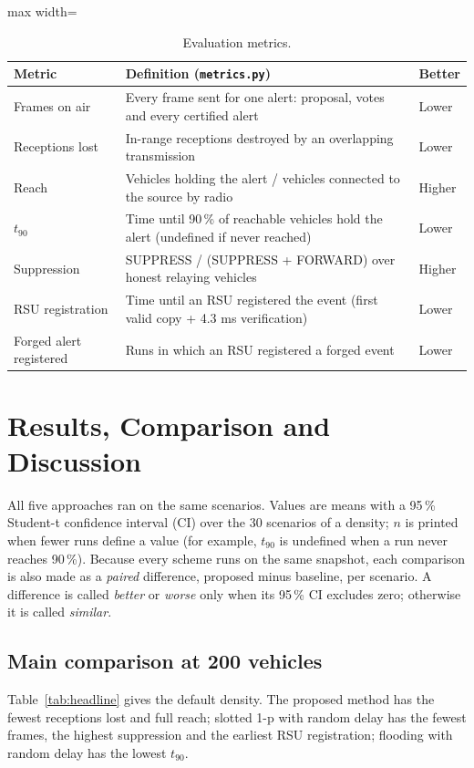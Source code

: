 \documentclass[11pt, a4paper]{article}
\begin{document}
\begin{table}[htbp]
\centering
\footnotesize
\renewcommand{\arraystretch}{1.2}
\begin{adjustbox}{max width=\textwidth}
\begin{tabular}{|p{4.4cm}|p{9.2cm}|p{1.6cm}|}
\hline
\textbf{Metric} & \textbf{Definition (\texttt{metrics.py})} & \textbf{Better} \\
\hline
Frames on air & Every frame sent for one alert: proposal, votes and every certified alert & Lower \\
Receptions lost & In-range receptions destroyed by an overlapping transmission & Lower \\
Reach & Vehicles holding the alert / vehicles connected to the source by radio & Higher \\
$t_{90}$ & Time until 90\,\% of reachable vehicles hold the alert (undefined if never reached) & Lower \\
Suppression & SUPPRESS / (SUPPRESS + FORWARD) over honest relaying vehicles & Higher \\
RSU registration & Time until an RSU registered the event (first valid copy + 4.3 ms verification) & Lower \\
Forged alert registered & Runs in which an RSU registered a forged event & Lower \\
\hline
\end{tabular}
\end{adjustbox}
\caption{Evaluation metrics.}
\end{table}

\section{Results, Comparison and Discussion}
\label{sec:results}
All five approaches ran on the same \NScenarios{} scenarios. Values are means with a 95\,\% Student-t confidence
interval (CI) over the 30 scenarios of a density; $n$ is printed when fewer runs define a value (for example, $t_{90}$ is
undefined when a run never reaches 90\,\%). Because every scheme runs on the same snapshot, each comparison is also made
as a \emph{paired} difference, proposed minus baseline, per scenario. A difference is called \emph{better} or
\emph{worse} only when its 95\,\% CI excludes zero; otherwise it is called \emph{similar}.

\subsection{Main comparison at 200 vehicles}
Table~\ref{tab:headline} gives the default density. The proposed method has the fewest receptions lost and full reach;
slotted 1-p with random delay has the fewest frames, the highest suppression and the earliest RSU registration;
flooding with random delay has the lowest $t_{90}$.
\end{document}
